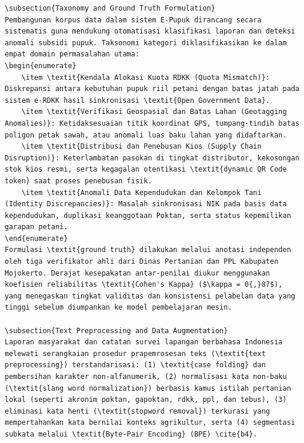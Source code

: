 \documentclass[conference]{IEEEtran}
\begin{document}
\begin{lstlisting}
\subsection{Taxonomy and Ground Truth Formulation}
Pembangunan korpus data dalam sistem E-Pupuk dirancang secara sistematis guna mendukung otomatisasi klasifikasi laporan dan deteksi anomali subsidi pupuk. Taksonomi kategori diklasifikasikan ke dalam empat domain permasalahan utama:
\begin{enumerate}
    \item \textit{Kendala Alokasi Kuota RDKK (Quota Mismatch)}: Diskrepansi antara kebutuhan pupuk riil petani dengan batas jatah pada sistem e-RDKK hasil sinkronisasi \textit{Open Government Data}.
    \item \textit{Verifikasi Geospasial dan Batas Lahan (Geotagging Anomalies)}: Ketidaksesuaian titik koordinat GPS, tumpang-tindih batas poligon petak sawah, atau anomali luas baku lahan yang didaftarkan.
    \item \textit{Distribusi dan Penebusan Kios (Supply Chain Disruption)}: Keterlambatan pasokan di tingkat distributor, kekosongan stok kios resmi, serta kegagalan otentikasi \textit{dynamic QR Code token} saat proses penebusan fisik.
    \item \textit{Anomali Data Kependudukan dan Kelompok Tani (Identity Discrepancies)}: Masalah sinkronisasi NIK pada basis data kependudukan, duplikasi keanggotaan Poktan, serta status kepemilikan garapan petani.
\end{enumerate}
Formulasi \textit{ground truth} dilakukan melalui anotasi independen oleh tiga verifikator ahli dari Dinas Pertanian dan PPL Kabupaten Mojokerto. Derajat kesepakatan antar-penilai diukur menggunakan koefisien reliabilitas \textit{Cohen's Kappa} ($\kappa = 0{,}87$), yang menegaskan tingkat validitas dan konsistensi pelabelan data yang tinggi sebelum diumpankan ke model pembelajaran mesin.

\subsection{Text Preprocessing and Data Augmentation}
Laporan masyarakat dan catatan survei lapangan berbahasa Indonesia melewati serangkaian prosedur prapemrosesan teks (\textit{text preprocessing}) terstandarisasi: (1) \textit{case folding} dan pembersihan karakter non-alfanumerik, (2) normalisasi kata non-baku (\textit{slang word normalization}) berbasis kamus istilah pertanian lokal (seperti akronim poktan, gapoktan, rdkk, ppl, dan tebus), (3) eliminasi kata henti (\textit{stopword removal}) terkurasi yang mempertahankan kata bernilai konteks agrikultur, serta (4) segmentasi subkata melalui \textit{Byte-Pair Encoding} (BPE) \cite{b4}.


\end{lstlisting}
\end{document}
